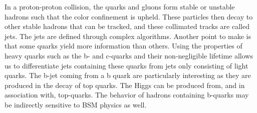 In a proton-proton collision, the quarks and gluons form stable or unstable hadrons such 
that the color confinement is upheld\cite{Hwang_Wu_2018}. These particles then decay to other stable 
hadrons that can be tracked, and these collimated tracks are called jets. The jets are defined through
complex algorithms. Another point to make is that some quarks yield more 
information than others. Using the properties of heavy quarks such as the b- and c-quarks and 
their non-negligible lifetime allows us to differentiate jets containing these quarks from 
jets only consisting of light quarks. The b-jet coming from a b quark are particularly interesting 
as they are produced in the decay of top quarks. The Higgs can be produced from, 
and in association with, top-quarks. The behavior of hadrons containing b-quarks may be 
indirectly sensitive to BSM physics as well. 